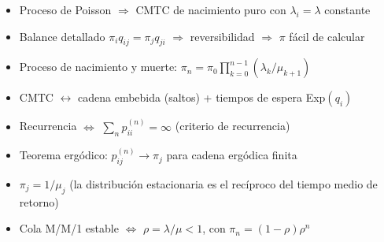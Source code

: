 \documentclass[10pt,a4paper]{article}
\numberwithin{equation}{section}
\newcommand{\muu}[1]{\mu_{#1}}                           %
\begin{document}
\vspace{10pt}
\begin{tcolorbox}[
    colback=sectionbg!8, colframe=sectionbg,
    boxrule=0.8pt, arc=4pt,
    left=8pt, right=8pt, top=6pt, bottom=6pt,
    fonttitle=\bfseries\sffamily,
    title={Conexiones clave del m\'odulo},
  ]
  \small
  \begin{itemize}
    \item Proceso de Poisson $\Rightarrow$ CMTC de nacimiento puro con $\lambda_i = \lambda$ constante
    \item Balance detallado $\pi_i q_{ij} = \pi_j q_{ji}$ $\Rightarrow$ reversibilidad $\Rightarrow$ $\pi$ f\'acil de calcular
    \item Proceso de nacimiento y muerte: $\pi_n = \pi_0\prod_{k=0}^{n-1}(\lambda_k/\mu_{k+1})$
    \item CMTC $\leftrightarrow$ cadena embebida (saltos) + tiempos de espera Exp$(q_i)$
    \item Recurrencia $\Leftrightarrow$ $\sum_n p_{ii}^{(n)} = \infty$
          \hfill (criterio de recurrencia)
    \item Teorema erg\'odico: $p_{ij}^{(n)} \to \pi_j$ para cadena erg\'odica finita
    \item $\pi_j = 1/\muu{j}$ \hfill (la distribuci\'on estacionaria es el rec\'iproco del tiempo medio de retorno)
    \item Cola M/M/1 estable $\Leftrightarrow$ $\rho = \lambda/\mu < 1$, con $\pi_n = (1-\rho)\rho^n$
  \end{itemize}
\end{tcolorbox}
\end{document}
